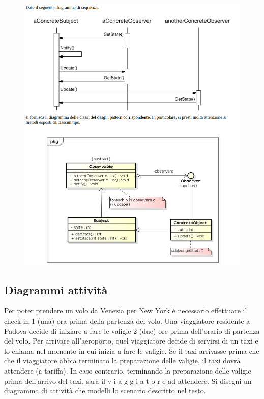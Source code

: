 \begin{figure}
\includegraphics[width=1\textwidth]{res/img/Esercizi/es-observer2}
\end{figure}

\subsection{Diagrammi attività}
Per poter prendere un volo da Venezia per New York è necessario effettuare il check-in 1 (una) ora prima della partenza
del volo. Una viaggiatore residente a Padova decide di iniziare a fare le valigie 2 (due) ore prima dell'orario di partenza del
volo. Per arrivare all'aeroporto, quel viaggiatore decide di servirsi di un taxi e lo chiama nel momento in cui inizia a fare
le valigie. Se il taxi arrivasse prima che che il viaggiatore abbia terminato la preparazione delle valigie, il taxi dovrà
attendere (a tariffa). In caso contrario, terminando la preparazione delle valigie prima dell'arrivo del taxi, sarà il
v i a g g i a t o r e ad attendere.
Si disegni un diagramma di attività che modelli lo scenario descritto nel testo.
 
